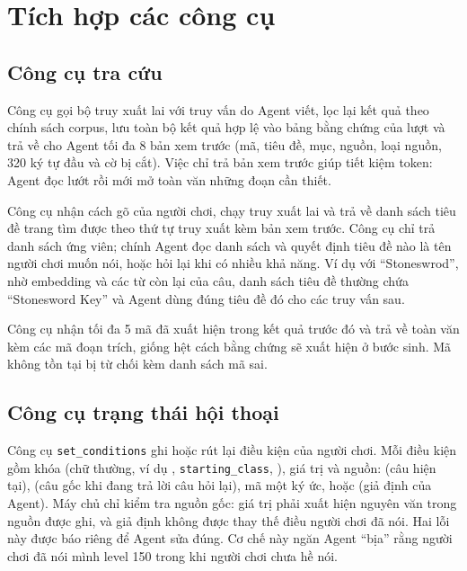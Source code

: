 \section{Tích hợp các công cụ}
\label{sec:impl_tools}

\subsection{Công cụ tra cứu}
\label{sec:impl_lookup}

Công cụ  gọi bộ truy xuất lai với truy vấn do Agent viết, lọc lại kết quả theo chính sách corpus, lưu toàn bộ kết quả hợp lệ vào bảng bằng chứng của lượt và trả về cho Agent tối đa 8 bản xem trước (mã, tiêu đề, mục, nguồn, loại nguồn, 320 ký tự đầu và cờ bị cắt). Việc chỉ trả bản xem trước giúp tiết kiệm token: Agent đọc lướt rồi mới mở toàn văn những đoạn cần thiết.

Công cụ  nhận cách gõ của người chơi, chạy truy xuất lai và trả về danh sách tiêu đề trang tìm được theo thứ tự truy xuất kèm bản xem trước. Công cụ chỉ trả danh sách ứng viên; chính Agent đọc danh sách và quyết định tiêu đề nào là tên người chơi muốn nói, hoặc hỏi lại khi có nhiều khả năng. Ví dụ với ``Stoneswrod'', nhờ embedding và các từ còn lại của câu, danh sách tiêu đề thường chứa ``Stonesword Key'' và Agent dùng đúng tiêu đề đó cho các truy vấn sau.

Công cụ  nhận tối đa 5 mã đã xuất hiện trong kết quả trước đó và trả về toàn văn kèm các mã đoạn trích, giống hệt cách bằng chứng sẽ xuất hiện ở bước sinh. Mã không tồn tại bị từ chối kèm danh sách mã sai.

\subsection{Công cụ trạng thái hội thoại}
\label{sec:impl_state_tools}

Công cụ \nolinkurl{set_conditions} ghi hoặc rút lại điều kiện của người chơi. Mỗi điều kiện gồm khóa (chữ thường, ví dụ , \nolinkurl{starting_class}, ), giá trị và nguồn:  (câu hiện tại),  (câu gốc khi đang trả lời câu hỏi lại), mã một ký ức, hoặc  (giả định của Agent). Máy chủ chỉ kiểm tra nguồn gốc: giá trị phải xuất hiện nguyên văn trong nguồn được ghi, và giả định không được thay thế điều người chơi đã nói. Hai lỗi này được báo riêng để Agent sửa đúng. Cơ chế này ngăn Agent ``bịa'' rằng người chơi đã nói mình level 150 trong khi người chơi chưa hề nói.

